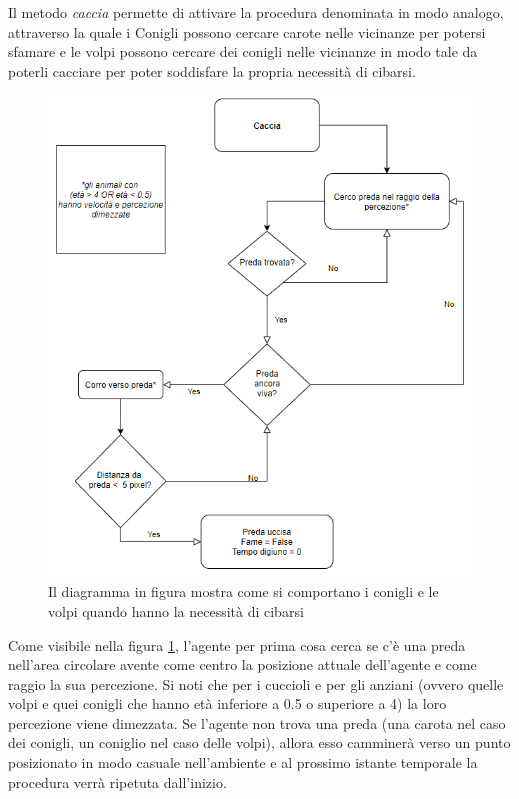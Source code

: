 \documentclass[11pt]{article}
\begin{document}
Il metodo \emph{caccia} permette di attivare la procedura denominata in modo analogo, attraverso la quale i Conigli possono cercare carote nelle vicinanze per potersi sfamare e le volpi possono cercare dei conigli nelle vicinanze in modo tale da poterli cacciare per poter soddisfare la propria necessità di cibarsi.
\begin{figure}
     \centering
     \includegraphics[scale = 0.7]{Caccia.png}
     \caption{Il diagramma in figura mostra come si comportano i conigli e le volpi quando hanno la necessità di cibarsi}
     \label{fig:diagrammaCaccia}
\end{figure}
Come visibile nella figura \ref{fig:diagrammaCaccia}, l'agente per prima cosa cerca se c'è una preda nell'area circolare avente come centro la posizione attuale dell'agente e come raggio la sua percezione. Si noti che per i cuccioli e per gli anziani (ovvero quelle volpi e quei conigli che hanno età inferiore a 0.5 o superiore a 4) la loro percezione viene dimezzata. Se l'agente non trova una preda (una carota nel caso dei conigli, un coniglio nel caso delle volpi), allora esso camminerà verso un punto posizionato in modo casuale nell'ambiente e al prossimo istante temporale la procedura verrà ripetuta dall'inizio. 
\end{document}

